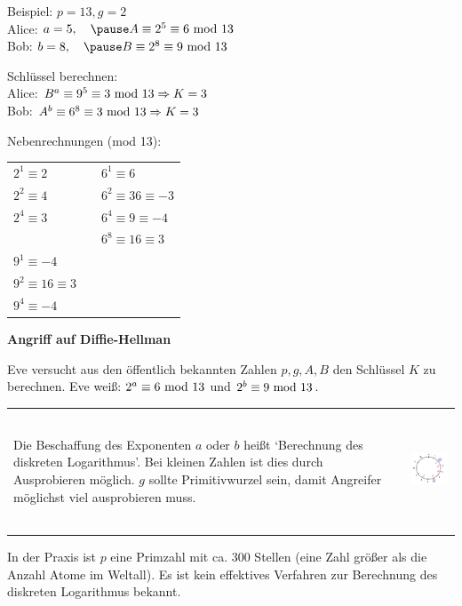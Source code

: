 \begin{frame}[fragile]

Beispiel: $p=13, g=2$ \\ \pause
Alice: $a=5, \quad \pause A \equiv 2^5 \equiv 6 \tmod 13$ \\
Bob: $b=8, \quad \pause B \equiv 2^8 \equiv 9 \tmod 13$ \pause

Schlüssel berechnen: \\ \pause
Alice: $B^a \equiv 9^5 \equiv 3 \text{ mod } 13 \Rightarrow K = 3$ \\ \pause
Bob: $A^b \equiv 6^8 \equiv 3 \text{ mod } 13 \Rightarrow K = 3$ \pause

\footnotesize
Nebenrechnungen (mod 13): \\
\begin{tabular}{l l l}
$2^1 \equiv 2$    &  \quad &  $6^1 \equiv 6$  \\
$2^2 \equiv 4$    &    &  $6^2 \equiv 36 \equiv -3$ \\
$2^4 \equiv 3$    &   &  $6^4 \equiv 9 \equiv -4$ \\
& & $6^8 \equiv 16 \equiv 3$  \\
$9^1 \equiv -4$ \\
$9^2 \equiv 16 \equiv 3$\\
$9^4 \equiv -4 $
\end{tabular}
\end{frame}


\begin{frame}[fragile]

\textbf{Angriff auf Diffie-Hellman} \pause

Eve versucht aus den öffentlich bekannten Zahlen $p,g,A,B$ den Schlüssel $K$ zu berechnen. \pause
Eve weiß: $2^a \equiv 6 \text{ mod } 13$ und $2^b \equiv 9 \text{ mod } 13$. \pause

\begin{tabular}{ll}
\begin{minipage}[b]{8cm}
Die Beschaffung des Exponenten $a$ oder $b$ heißt `Berechnung des diskreten Logarithmus'. \pause Bei kleinen
Zahlen ist dies durch Ausprobieren möglich.  $g$ sollte Primitivwurzel sein, damit Angreifer möglichst viel ausprobieren muss.  
\end{minipage} &
\includegraphics[height=3.5cm]{bild2.png}
\end{tabular} \pause

In der Praxis ist $p$ eine Primzahl mit ca. 300 Stellen (eine Zahl größer als die Anzahl Atome im Weltall). Es 
ist kein effektives Verfahren zur Berechnung des diskreten Logarithmus bekannt.
\end{frame}

